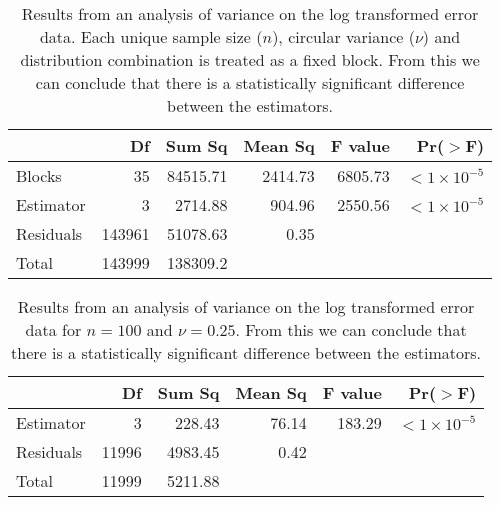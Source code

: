 \begin{table}[h!]
\caption{Results from an analysis of variance on the log transformed error data.  Each unique sample size ($n$), circular variance ($\nu$) and distribution combination is treated as a fixed block.  From this we can conclude that there is a statistically significant difference between the estimators.}
\begin{center}
\begin{tabular}{lrrrrr}
  \hline
 & Df & Sum Sq & Mean Sq & F value & Pr($>$F) \\ 
  \hline
Blocks      & 35 & 84515.71 & 2414.73 & 6805.73 & $<1\times 10^{-5}$ \\ 
Estimator   & 3 & 2714.88 & 904.96 & 2550.56 & $<1\times 10^{-5}$ \\ 
Residuals   & 143961 & 51078.63 & 0.35 &  &  \\ \hline
Total & 143999 & 138309.2&&&\\
   \hline
\end{tabular}
\end{center}
\end{table}

\begin{table}[h!]
\caption{Results from an analysis of variance on the log transformed error data for $n=100$ and $\nu=0.25$.  From this we can conclude that there is a statistically significant difference between the estimators.}
\begin{center}
\begin{tabular}{lrrrrr}
  \hline
 & Df & Sum Sq & Mean Sq & F value & Pr($>$F) \\ 
  \hline
Estimator   & 3 & 228.43 & 76.14 & 183.29 & $<1\times 10^{-5}$ \\ 
Residuals   & 11996 & 4983.45 & 0.42 &  &  \\ \hline
Total & 11999 & 5211.88 &&&\\
   \hline
\end{tabular}
\end{center}
\end{table}
